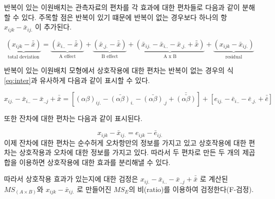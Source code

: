 \documentclass[
]{book}
\theoremstyle{definition}
\theoremstyle{definition}
\theoremstyle{definition}
\theoremstyle{remark}
\begin{document}
반복이 있는 이원배치는 관측자료의 편차를 각 효과에 대한 편차들로 다음과 같이 분해할 수 있다. 주목할 점은 반복이 있기 떄문에 반복이 없는 경우보다 하나의 항 \(x_{ijk} - {\bar x}_{ij.}\) 이 추가된다.

\[ 
\underbrace{ (x_{ijk} - \bar{\bar {x}}) }_{\text{total deviation}} = 
\underbrace{( {\bar x}_{i..} - \bar{\bar {x}} ) }_{\text{A effect}} + \underbrace{( {\bar x}_{.j.} - \bar{\bar {x}} ) }_{\text{B effect}} + \underbrace{ ( {\bar x}_{ij.} -{\bar x}_{i..} - {\bar x}_{.j.} + \bar{\bar {x}}  )}_{\text{A x B}} 
+ \underbrace{ ( x_{ijk} - {\bar x}_{ij.} )}_{\text{residual}} 
\]

반복이 있는 이원배치 모형에서 상호작용에 대한 편차는 반복이 없는 경우의 식 \eqref{eq:inter}과 유사하게 다음과 같이 표시할 수 있다.

\[
x_{ij.} -{\bar x}_{i..} - {\bar x}_{..j} + \bar{\bar {x}}  = 
[ (\alpha \beta)_{ij.} - \bar {(\alpha \beta)}_{i. } -\bar {(\alpha \beta)}_{.j} + \bar {\bar {(\alpha \beta)}} ] + 
[ e_{ij.} - \bar {e}_{i.. } -\bar {e}_{.j.} + \bar {\bar {e}}]
\]

또한 잔차에 대한 편차는 다음과 같이 표시된다.

\[
x_{ijk} - {\bar x}_{ij.} = e_{ijk} - \bar {e}_{ij. }
\]
이제 잔차에 대한 편차는 순수허게 오차항만의 정보를 가지고 있고 상호작용에 대한 편차는 상호작용과 오차에 대한 정보를 가지고 있다. 따라서 두 편차로 만든 두 개의 제곱합을 이용하면 상호작용에 대한 효과를 분리해낼 수 있다.

따라서 상호작용 효과가 있는지에 대한 검정은 \(x_{ij.} -{\bar x}_{i..} - {\bar x}_{..j} + \bar{\bar {x}}\) 로 계산된 \(MS_{(A \times B)}\)와 \(x_{ijk} - {\bar x}_{ij.}\) 로 만들어진 \(MS_E\)의 비(ratio)를 이용하여 검정한다(F-검정).

  
\end{document}
